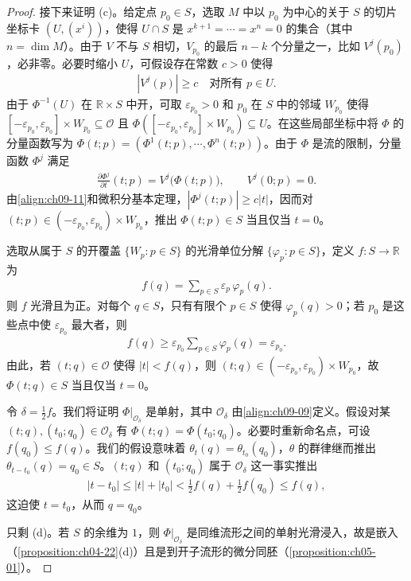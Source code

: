 \documentclass[../../main.tex]{subfiles}
\begin{document}
\begin{proof}
接下来证明 (c)。给定点 $p_0\in S$，选取 $M$ 中以 $p_0$ 为中心的关于 $S$ 的切片坐标卡 $(U,(x^i))$，使得 $U\cap S$ 是 $x^{k+1}=\cdots=x^n=0$ 的集合（其中 $n=\dim M$）。由于 $V$ 不与 $S$ 相切，$V_{p_0}$ 的最后 $n-k$ 个分量之一，比如 $V^j(p_0)$，必非零。必要时缩小 $U$，可假设存在常数 $c>0$ 使得
\begin{align}
|V^j(p)|\geqslant c\quad\text{对所有 }p\in U. \label{align:ch09-11}
\end{align}
由于 $\Phi^{-1}(U)$ 在 $\mathbb{R}\times S$ 中开，可取 $\varepsilon_{p_0}>0$ 和 $p_0$ 在 $S$ 中的邻域 $W_{p_0}$ 使得 $[-\varepsilon_{p_0},\varepsilon_{p_0}]\times W_{p_0}\subseteq\mathcal{O}$ 且 $\Phi([-\varepsilon_{p_0},\varepsilon_{p_0}]\times W_{p_0})\subseteq U$。在这些局部坐标中将 $\Phi$ 的分量函数写为 $\Phi(t;p)=(\Phi^1(t;p),\cdots ,\Phi^n(t;p))$。由于 $\Phi$ 是流的限制，分量函数 $\Phi^j$ 满足
\begin{align*}
\frac{\partial\Phi^j}{\partial t}(t;p)=V^j\bigl(\Phi(t;p)\bigr),\qquad V^j(0;p)=0.
\end{align*}
由\eqref{align:ch09-11}和微积分基本定理，$|\Phi^j(t;p)|\geqslant c|t|$，因而对 $(t;p)\in(-\varepsilon_{p_0},\varepsilon_{p_0})\times W_{p_0}$，推出 $\Phi(t;p)\in S$ 当且仅当 $t=0$。

选取从属于 $S$ 的开覆盖 $\{W_p:p\in S\}$ 的光滑单位分解 $\{\varphi_p:p\in S\}$，定义 $f\colon S\to\mathbb{R}$ 为
\begin{align}
f(q)=\sum_{p\in S}\varepsilon_p\,\varphi_p(q). \label{align:ch09-12}
\end{align}
则 $f$ 光滑且为正。对每个 $q\in S$，只有有限个 $p\in S$ 使得 $\varphi_p(q)>0$；若 $p_0$ 是这些点中使 $\varepsilon_{p_0}$ 最大者，则
\begin{align*}
f(q)\geqslant\varepsilon_{p_0}\sum_{p\in S}\varphi_p(q)=\varepsilon_{p_0}.
\end{align*}
由此，若 $(t;q)\in\mathcal{O}$ 使得 $|t|<f(q)$，则 $(t;q)\in(-\varepsilon_{p_0},\varepsilon_{p_0})\times W_{p_0}$，故 $\Phi(t;q)\in S$ 当且仅当 $t=0$。

令 $\delta=\frac12 f$。我们将证明 $\Phi|_{\mathcal{O}_\delta}$ 是单射，其中 $\mathcal{O}_\delta$ 由\eqref{align:ch09-09}定义。假设对某 $(t;q),(t_0;q_0)\in\mathcal{O}_\delta$ 有 $\Phi(t;q)=\Phi(t_0;q_0)$。必要时重新命名点，可设 $f(q_0)\leqslant f(q)$。我们的假设意味着 $\theta_t(q)=\theta_{t_0}(q_0)$，$\theta$ 的群律继而推出 $\theta_{t-t_0}(q)=q_0\in S$。$(t;q)$ 和 $(t_0;q_0)$ 属于 $\mathcal{O}_\delta$ 这一事实推出
\begin{align*}
|t-t_0|\leqslant|t|+|t_0|<\tfrac12 f(q)+\tfrac12 f(q_0)\leqslant f(q),
\end{align*}
这迫使 $t=t_0$，从而 $q=q_0$。

只剩 (d)。若 $S$ 的余维为 $1$，则 $\Phi|_{\mathcal{O}_\delta}$ 是同维流形之间的单射光滑浸入，故是嵌入（\cref{proposition:ch04-22}(d)）且是到开子流形的微分同胚（\cref{proposition:ch05-01}）。
\end{proof}
\end{document}
